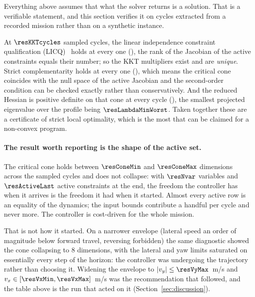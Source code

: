 \documentclass[11pt,a4paper]{article}
\begin{document}
Everything above assumes that what the solver returns is a solution. That is a verifiable statement, and this
section verifies it on cycles extracted from a recorded mission rather than on a synthetic instance.

\begin{table}[htbp]
  \centering
  \small
  \caption{%
  Optimality diagnostics at sampled cycles of the recorded run \resBag. ``active'' counts equalities and
  active bounds together; ``rank'' is the rank of the Jacobian of the active constraints, so LICQ holds
  when the two coincide.}
  \label{res:tab:kkt}
\end{table}

At $\resKKTcycles$ sampled cycles, the linear independence constraint qualification (LICQ)~\cite{nocedal2006numopt} holds at every one (\resLICQalways), the rank of the Jacobian of
the active constraints equals their number; so the KKT multipliers exist and are \emph{unique}. Strict
complementarity holds at every one (\resStrictAlways), which means the critical cone coincides with the null
space of the active Jacobian and the second-order condition can be checked exactly rather than
conservatively. And the reduced Hessian is positive definite on that cone at every cycle
(\resSOCalways), the smallest projected eigenvalue over the profile being $\resLambdaMinWorst$. Taken
together these are a certificate of strict local optimality, which is the most that can be claimed for a
non-convex program.

\paragraph{The result worth reporting is the shape of the active set.} The critical cone holds between
$\resConeMin$ and $\resConeMax$ dimensions across the sampled cycles and does not collapse: with $\resNvar$ variables and $\resActiveLast$ active
constraints at the end, the freedom the controller has when it arrives is the freedom it had when it
started. Almost every active row is an equality of the dynamics; the input bounds contribute a handful per
cycle and never more. The controller is cost-driven for the whole mission.

That is not how it started. On a narrower envelope (lateral speed an order of magnitude below forward
travel, reversing forbidden) the same diagnostic showed the cone collapsing to $8$ dimensions, with the
lateral and yaw limits saturated on essentially every step of the horizon: the controller was undergoing the
trajectory rather than choosing it. Widening the envelope to $|v_y|\le\resVyMax$~m/s and
$v_x\in[\resVxMin,\resVxMax]$~m/s was the recommendation that followed, and the table above is the run that
acted on it (Section~\ref{sec:discussion}).
\end{document}
